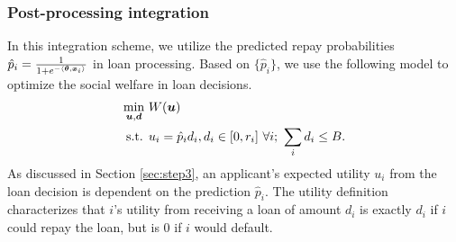 \documentclass{article}[11pt]
\begin{document}
\subsubsection*{Post-processing integration}
In this integration scheme, we utilize the predicted repay probabilities $\hat{p}_i = \frac{1}{1+e^{-\langle\bm{\theta},\bm{x}_i\rangle}}$ in loan processing. Based on $\{\hat{p}_i\}$, we use the following model to optimize the social welfare in loan decisions.
\begin{gather} \label{sys:dec}
    \begin{aligned}
    \min_{\bm{u}, \bm{d}} ~ & W(\bm{u}) \\
   \text{s.t. } & u_i = \hat{p}_i d_i, d_i \in [0, r_i] ~\forall i; ~ \sum_i d_i \leq B.
    \end{aligned}
\end{gather}
As discussed in Section \ref{sec:step3}, an applicant's expected utility $u_i$ from the loan decision is dependent on the prediction $\hat{p}_i$. The utility definition characterizes that $i$'s utility from receiving a loan of amount $d_i$ is exactly $d_i$ if $i$ could repay the loan, but is $0$ if $i$ would default.
\end{document}
